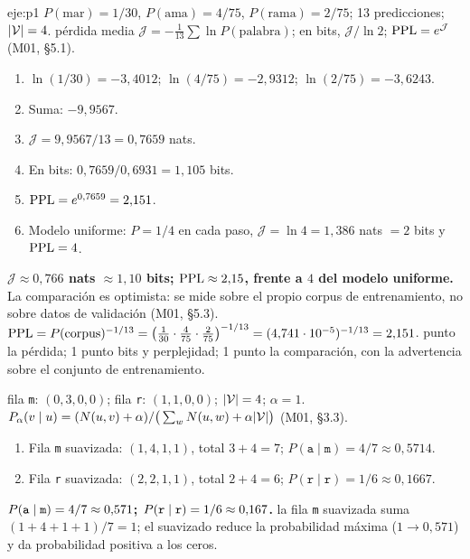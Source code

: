 \begin{solucion}{eje:p1}
\datos $P(\text{mar})=1/30$, $P(\text{ama})=4/75$, $P(\text{rama})=2/75$; 13 predicciones; $\lvert\mathcal{V}\rvert=4$.
\planteamiento pérdida media $\mathcal J=-\frac1{13}\sum\ln P(\text{palabra})$; en bits, $\mathcal J/\ln 2$; $\operatorname{PPL}=e^{\mathcal J}$ (M01, §5.1).
\pasos
\begin{enumerate}[label=\arabic*.]
  \item $\ln(1/30)=-3{,}4012$; $\ln(4/75)=-2{,}9312$; $\ln(2/75)=-3{,}6243$.
  \item Suma: $-9{,}9567$.
  \item $\mathcal J=9{,}9567/13=0{,}7659$ nats.
  \item En bits: $0{,}7659/0{,}6931=1{,}105$ bits.
  \item $\operatorname{PPL}=e^{0{,}7659}=2{,}151$.
  \item Modelo uniforme: $P=1/4$ en cada paso, $\mathcal J=\ln 4=1{,}386$ nats $=2$ bits y $\operatorname{PPL}=4$.
\end{enumerate}
\resultado \textbf{$\mathcal J\approx 0{,}766$ nats $\approx 1{,}10$ bits; $\operatorname{PPL}\approx 2{,}15$, frente a $4$ del modelo uniforme.} La comparación es optimista: se mide sobre el propio corpus de entrenamiento, no sobre datos de validación (M01, §5.3).
\comprobacion $\operatorname{PPL}=P(\text{corpus})^{-1/13}=\big(\tfrac1{30}\cdot\tfrac4{75}\cdot\tfrac2{75}\big)^{-1/13}=(4{,}741\cdot10^{-5})^{-1/13}=2{,}151$.
 punto la pérdida; 1 punto bits y perplejidad; 1 punto la comparación, con la advertencia sobre el conjunto de entrenamiento.

\datos fila \texttt m: $(0,3,0,0)$; fila \texttt r: $(1,1,0,0)$; $\lvert\mathcal{V}\rvert=4$; $\alpha=1$.
\planteamiento $P_\alpha(v\mid u)=(N(u,v)+\alpha)/\big(\sum_w N(u,w)+\alpha\lvert\mathcal{V}\rvert\big)$ (M01, §3.3).
\pasos
\begin{enumerate}[label=\arabic*.]
  \item Fila \texttt m suavizada: $(1,4,1,1)$, total $3+4=7$; $P(\texttt a\mid\texttt m)=4/7\approx 0{,}5714$.
  \item Fila \texttt r suavizada: $(2,2,1,1)$, total $2+4=6$; $P(\texttt r\mid\texttt r)=1/6\approx 0{,}1667$.
\end{enumerate}
\resultado \textbf{$P(\textnormal{\texttt{a}}\mid\textnormal{\texttt{m}})=4/7\approx 0{,}571$; $P(\textnormal{\texttt{r}}\mid\textnormal{\texttt{r}})=1/6\approx 0{,}167$.}
\comprobacion la fila \texttt m suavizada suma $(1+4+1+1)/7=1$; el suavizado reduce la probabilidad máxima ($1\to 0{,}571$) y da probabilidad positiva a los ceros.


\end{solucion}
